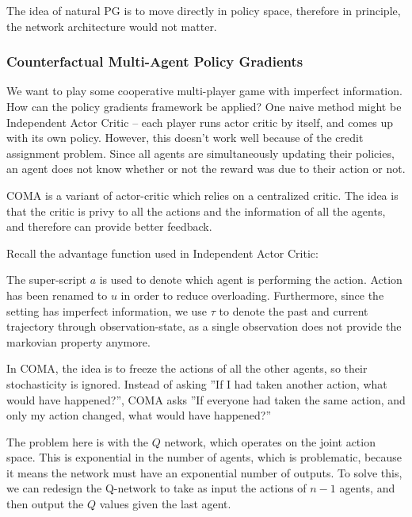 \documentclass[12pt]{article}
\begin{document}
The idea of natural PG is to move directly in policy space, therefore in principle, the network architecture would not matter. 


\subsubsection{Counterfactual Multi-Agent Policy Gradients}

We want to play some cooperative multi-player game with imperfect information. How can the policy gradients framework be applied? One naive method might be Independent Actor Critic -- each player runs actor critic by itself, and comes up with its own policy. However, this doesn't work well because of the credit assignment problem. Since all agents are simultaneously updating their policies, an agent does not know whether or not the reward was due to their action or not.

COMA is a variant of actor-critic which relies on a centralized critic. The idea is that the critic is privy to all the actions and the information of all the agents, and therefore can provide better feedback. 

Recall the advantage function used in Independent Actor Critic:


The super-script $a$ is used to denote which agent is performing the action. Action has been renamed to $u$ in order to reduce overloading. Furthermore, since the setting has imperfect information, we use $\tau$ to denote the past and current trajectory through observation-state, as a single observation does not provide the markovian property anymore.

In COMA, the idea is to freeze the actions of all the other agents, so their stochasticity is ignored. Instead of asking ''If I had taken another action, what would have happened?'', COMA asks ''If everyone had taken the same action, and only my action changed, what would have happened?''


The problem here is with the $Q$ network, which operates on the joint action space. This is exponential in the number of agents, which is problematic, because it means the network must have an exponential number of outputs. To solve this, we can redesign the Q-network to take as input the actions of $n-1$ agents, and then output the $Q$ values given the last agent. 
\end{document}

